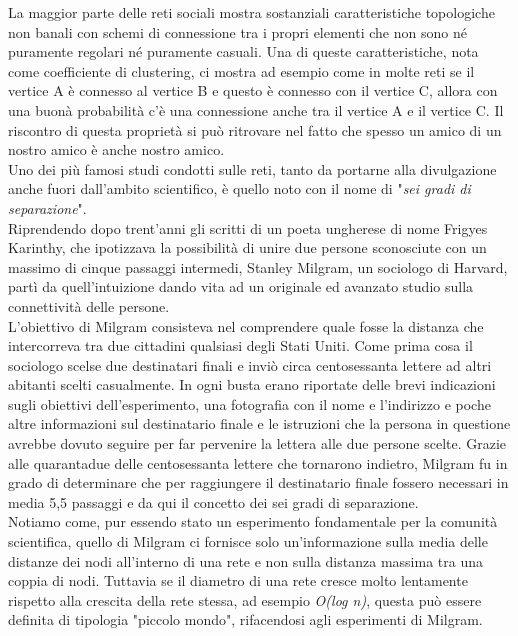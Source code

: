 \documentclass[twoside,openright,titlepage,fleqn,
	headinclude,11pt,a4paper,BCOR5mm,footinclude,pdftex
	]{scrbook}
\begin{document}
La maggior parte delle reti sociali mostra sostanziali caratteristiche topologiche non banali con schemi di connessione tra i propri elementi che non sono né puramente regolari né puramente casuali. Una di queste caratteristiche, nota come coefficiente di clustering, ci mostra ad esempio come in molte reti se il vertice A è connesso al vertice B e questo è connesso con il vertice C, allora con una buonà probabilità c'è una connessione anche tra il vertice A e il vertice C. Il riscontro di questa proprietà si può ritrovare nel fatto che spesso un amico di un nostro amico è anche nostro amico.\\
Uno dei più famosi studi condotti sulle reti, tanto da portarne alla divulgazione anche fuori dall'ambito scientifico, è quello noto  con il nome di "\textit{sei gradi di separazione}".\\Riprendendo dopo trent'anni gli scritti di un poeta ungherese di nome Frigyes Karinthy, che ipotizzava la possibilità di unire due persone sconosciute con un massimo di cinque passaggi intermedi, Stanley Milgram, un sociologo di Harvard, partì da quell'intuizione dando vita ad un originale ed avanzato studio sulla connettività delle persone.\\L'obiettivo di Milgram consisteva nel comprendere quale fosse la distanza che intercorreva tra due cittadini qualsiasi degli Stati Uniti. Come prima cosa il sociologo scelse due destinatari finali e inviò circa centosessanta lettere ad altri abitanti scelti casualmente. In ogni busta erano riportate delle brevi indicazioni sugli obiettivi dell'esperimento, una fotografia con il nome e l'indirizzo e poche altre informazioni sul destinatario finale e le istruzioni che la persona in questione avrebbe dovuto seguire per far pervenire la lettera alle due persone scelte. Grazie alle quarantadue delle centosessanta lettere che tornarono indietro, Milgram fu in grado di determinare che per raggiungere il destinatario finale fossero necessari in media 5,5 passaggi e da qui il concetto dei sei gradi di separazione.\\
Notiamo come, pur essendo stato un esperimento fondamentale per la comunità scientifica, quello di Milgram ci fornisce solo un'informazione sulla media delle distanze dei nodi all'interno di una rete e non sulla distanza massima tra una coppia di nodi. Tuttavia se il diametro di una rete cresce molto lentamente rispetto alla crescita della rete stessa, ad esempio \textit{O(log n)}, questa può essere definita di tipologia "piccolo mondo", rifacendosi agli esperimenti di Milgram.\\
\end{document}
